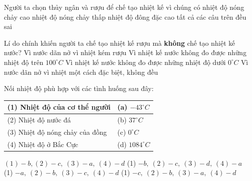 \begin{ex} 
	Người ta chọn thủy ngân và rượu để chế tạo nhiệt kế vì
	\choice
	{chúng có nhiệt độ nóng chảy cao}
	{\True nhiệt độ nóng chảy thấp}
	{nhiệt độ đông đặc cao}
	{tất cả các câu trên đều sai}
	
\end{ex}
\begin{ex} 
	Lí do chính khiến người ta chế tạo nhiệt kế rượu mà \textbf{không} chế tạo nhiệt kế nước?
	\choice
	{Vì nước dãn nở vì nhiệt kém rượu}
	{Vì nhiệt kế nước không đo được những nhiệt độ trên $100^\circ C$}
	{Vì nhiệt kế nước không đo được những nhiệt độ dưới $0^\circ C$}
	{\True Vì nước dãn nở vì nhiệt một cách đặc biệt, không đều}
\end{ex}
\begin{ex} 
	Nối nhiệt độ phù hợp với các tình huống sau đây:
	\begin{center}
		\begin{tabular}{|l|l|}
			\hline
			(1) Nhiệt độ của cơ thể người & (a) $-43^\circ C$ \\
			\hline
			(2) Nhiệt độ nước đá & (b) $37^\circ C$ \\
			\hline
			(3) Nhiệt độ nóng chảy của đồng & (c) $0^\circ C$ \\
			\hline
			(4) Nhiệt độ ở Bắc Cực & (d) $1084^\circ C$ \\
			\hline
		\end{tabular}
	\end{center}
	\choice
	{$(1)-b,(2)-c,\ (3)-a,\ (4)-d$}
	{\True (1) $-b,\ (2)-c,\ (3)-d,\ (4)-a$}
	{(1) $-a,\ (2)-b,\ (3)-c,\ (4)-d$}
	{(1) $-c,\ (2)-b,\ (3)-a,\ (4)-d$}
\end{ex}
